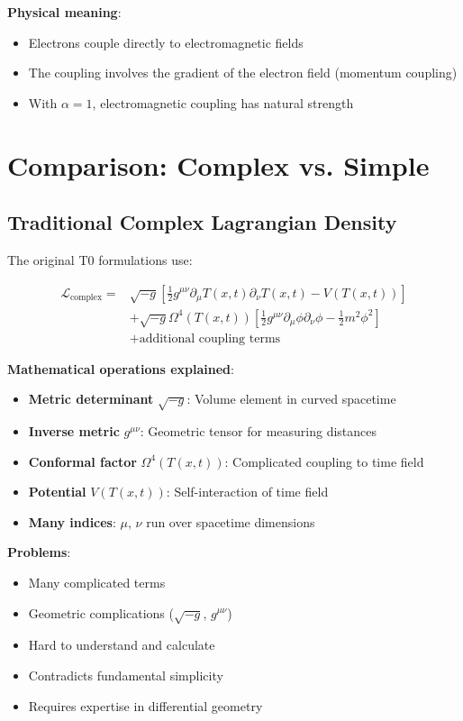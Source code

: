 \documentclass[12pt,a4paper]{article}
\newcommand{\Tfield}{T(x,t)}
\newcommand{\Lag}{\mathcal{L}}
\theoremstyle{definition}
\theoremstyle{remark}
\begin{document}
	\textbf{Physical meaning}:
	\begin{itemize}
		\item Electrons couple directly to electromagnetic fields
		\item The coupling involves the gradient of the electron field (momentum coupling)
		\item With $\alpha = 1$, electromagnetic coupling has natural strength
	\end{itemize}
	
	\section{Comparison: Complex vs. Simple}
	
	\subsection{Traditional Complex Lagrangian Density}
	
	The original T0 formulations use:
	
	\begin{align}
		\Lag_{\text{complex}} = &\sqrt{-g} \left[\frac{1}{2} g^{\mu\nu} \partial_\mu \Tfield \partial_\nu \Tfield - V(\Tfield)\right] \\
		&+ \sqrt{-g} \Omega^4(\Tfield) \left[\frac{1}{2} g^{\mu\nu} \partial_\mu \phi \partial_\nu \phi - \frac{1}{2} m^2 \phi^2\right] \\
		&+ \text{additional coupling terms}
	\end{align}
	
	\textbf{Mathematical operations explained}:
	\begin{itemize}
		\item \textbf{Metric determinant} $\sqrt{-g}$: Volume element in curved spacetime
		\item \textbf{Inverse metric} $g^{\mu\nu}$: Geometric tensor for measuring distances
		\item \textbf{Conformal factor} $\Omega^4(\Tfield)$: Complicated coupling to time field
		\item \textbf{Potential} $V(\Tfield)$: Self-interaction of time field
		\item \textbf{Many indices}: $\mu$, $\nu$ run over spacetime dimensions
	\end{itemize}
	
	\textbf{Problems}:
	\begin{itemize}
		\item Many complicated terms
		\item Geometric complications ($\sqrt{-g}$, $g^{\mu\nu}$)
		\item Hard to understand and calculate
		\item Contradicts fundamental simplicity
		\item Requires expertise in differential geometry
	\end{itemize}
	
\end{document}
